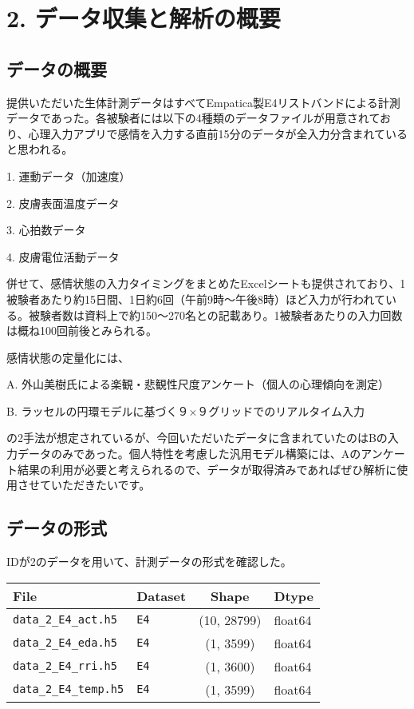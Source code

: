 \documentclass[a4paper,11pt]{article}
\begin{document}
\newpage
\section*{2. データ収集と解析の概要}
\subsection*{データの概要}
提供いただいた生体計測データはすべてEmpatica製E4リストバンドによる計測データであった。各被験者には以下の4種類のデータファイルが用意されており、心理入力アプリで感情を入力する直前15分のデータが全入力分含まれていると思われる。

1. 運動データ（加速度）

2. 皮膚表面温度データ

3. 心拍数データ

4. 皮膚電位活動データ

併せて、感情状態の入力タイミングをまとめたExcelシートも提供されており、1被験者あたり約15日間、1日約6回（午前9時～午後8時）ほど入力が行われている。被験者数は資料上で約150～270名との記載あり。1被験者あたりの入力回数は概ね100回前後とみられる。


感情状態の定量化には、

A. 外山美樹氏による楽観・悲観性尺度アンケート（個人の心理傾向を測定）

B. ラッセルの円環モデルに基づく９×９グリッドでのリアルタイム入力

の2手法が想定されているが、今回いただいたデータに含まれていたのはBの入力データのみであった。個人特性を考慮した汎用モデル構築には、Aのアンケート結果の利用が必要と考えられるので、データが取得済みであればぜひ解析に使用させていただきたいです。


\subsection*{データの形式}
IDが2のデータを用いて、計測データの形式を確認した。
\begin{table}[ht]
  \centering
  \begin{tabular}{|l|l|c|l|}
    \hline
    \textbf{File} & \textbf{Dataset} & \textbf{Shape} & \textbf{Dtype} \\ \hline
    \texttt{data\_2\_E4\_act.h5} & \texttt{E4} & (10, 28799) & float64 \\ \hline
    \texttt{data\_2\_E4\_eda.h5} & \texttt{E4} & (1, 3599)   & float64 \\ \hline
    \texttt{data\_2\_E4\_rri.h5} & \texttt{E4} & (1, 3600)   & float64 \\ \hline
    \texttt{data\_2\_E4\_temp.h5} & \texttt{E4} & (1, 3599)   & float64 \\ \hline
  \end{tabular}
\end{table}
\end{document}
